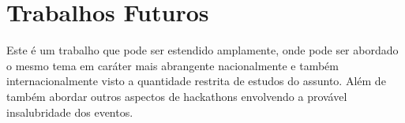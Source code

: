 \section{Trabalhos Futuros}


 Este é um trabalho que pode ser estendido amplamente, onde pode ser abordado o mesmo tema em caráter mais abrangente nacionalmente e também internacionalmente visto a quantidade restrita de estudos do assunto. Além de também abordar outros aspectos de hackathons envolvendo a provável insalubridade dos eventos.